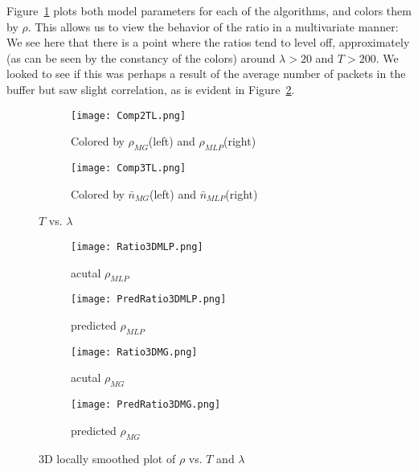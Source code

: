 \documentclass[oribibl]{llncs}
\begin{document}
\vspace{-26pt}
Figure~\ref{fig:Comp2TL} plots both model parameters for each of the algorithms, and colors them by $\rho$. This allows us to view the behavior of the ratio in a multivariate manner: We see here that there is a point where the ratios tend to level off, approximately (as can be seen by the constancy of the colors) around $\lambda>20$ and $T>200$. We looked to see if this was perhaps a result of the average number of packets in the buffer but saw slight correlation, as is evident in Figure~\ref{fig:Comp3TL}.



\begin{figure*}\centering

\begin{subfigure}[b]{.45\textwidth}
  \texttt{[image: Comp2TL.png]}
  \caption{Colored by $\rho_{MG}$(left) and $\rho_{MLP}$(right)}
  \label{fig:Comp2TL}
\end{subfigure}
\hfill
\begin{subfigure}[b]{.45\textwidth}
  \texttt{[image: Comp3TL.png]}
  \caption{Colored by $\bar{n}_{MG}$(left) and $\bar{n}_{MLP}$(right)}
  \label{fig:Comp3TL}
\end{subfigure}
\caption{$T$ vs. $\lambda$}
\label{fig:Comp23}
\end{figure*}


\begin{figure}\centering

\begin{subfigure}{.45\textwidth}
  \centering
  \texttt{[image: Ratio3DMLP.png]}
  \caption{acutal $\rho_{MLP}$}
  \label{fig:Ratio3DMLP}
\end{subfigure}
\hfill
\begin{subfigure}{.45\textwidth}
  \centering
  \texttt{[image: PredRatio3DMLP.png]}
  \caption{predicted $\rho_{MLP}$}
  \label{fig:PredRatio3DMLP}
\end{subfigure}

\begin{subfigure}{.45\textwidth}
  \centering
  \texttt{[image: Ratio3DMG.png]}
  \caption{acutal $\rho_{MG}$ }
  \label{fig:Ratio3DMG}
\end{subfigure}
\hfill
\begin{subfigure}{.45\textwidth}
  \centering
  \texttt{[image: PredRatio3DMG.png]}
  \caption{predicted $\rho_{MG}$ }
  \label{fig:PredRatio3DMG}
\end{subfigure}

\caption{3D locally smoothed plot of $\rho$ vs. $T$ and $\lambda$}
\label{fig:3DMLP}
\end{figure}
\end{document}
